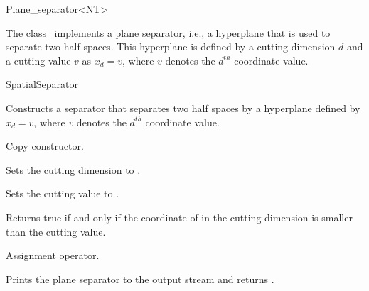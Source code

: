 

\begin{ccRefClass}{Plane_separator<NT>}  %


\begin{ccAdvanced}

\ccDefinition
  
The class \ccRefName\ implements a plane separator, i.e., a hyperplane that is used to separate two half spaces.
This hyperplane is defined by a cutting dimension $d$ and a cutting value $v$
as $x_d=v$, where $v$ denotes the $d^{th}$ coordinate value.


\ccIsModel

SpatialSeparator

\ccCreation
{}  %



{Constructs a separator that separates two half spaces by a hyperplane
defined by $x_d=v$, where $v$ denotes the $d^{th}$ coordinate value.}

{Copy constructor.}

\ccOperations

{Sets the cutting dimension to . }

{Sets the cutting value to . }



{Returns true if and only if the coordinate of  in the cutting dimension is smaller than the cutting value.}

{Assignment operator.}


\ccGlueBegin
{}
{Prints the plane separator  to the output stream  and returns .}
\ccGlueEnd

\end{ccAdvanced}

\end{ccRefClass}


